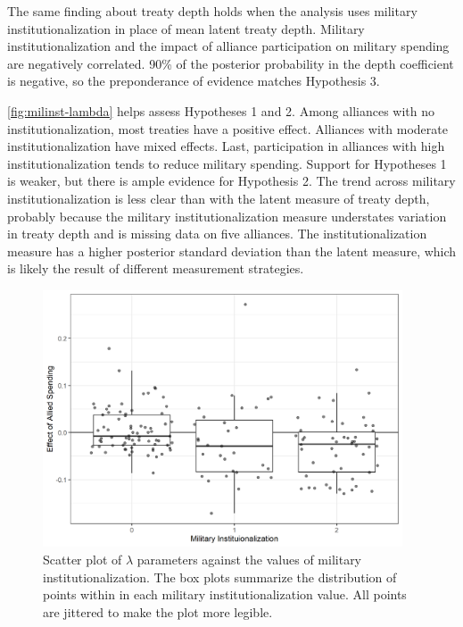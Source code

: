 \documentclass[12pt]{article}
\begin{document}
The same finding about treaty depth holds when the analysis uses military institutionalization in place of mean latent treaty depth. 
Military institutionalization and the impact of alliance participation on military spending are negatively correlated. 
90\% of the posterior probability in the depth coefficient is negative, so the preponderance of evidence matches Hypothesis 3. 


\autoref{fig:milinst-lambda} helps assess Hypotheses 1 and 2. 
Among alliances with no institutionalization, most treaties have a positive effect. 
Alliances with moderate institutionalization have mixed effects. 
Last, participation in alliances with high institutionalization tends to reduce military spending. 
Support for Hypotheses 1 is weaker, but there is ample evidence for Hypothesis 2. 
The trend across military institutionalization is less clear than with the latent measure of treaty depth, probably because the military institutionalization measure understates variation in treaty depth and is missing data on five alliances. 
The institutionalization measure has a higher posterior standard deviation than the latent measure, which is likely the result of different measurement strategies. 


\begin{figure}[htbp]
	\centering
		\includegraphics[width=0.95\textwidth]{milinst-lambda.png}
	\caption{Scatter plot of $\lambda$ parameters against the values of military institutionalization. The box plots summarize the distribution of points within in each military institutionalization value. All points are jittered to make the plot more legible.}
	\label{fig:milinst-lambda}
\end{figure}
\end{document}
